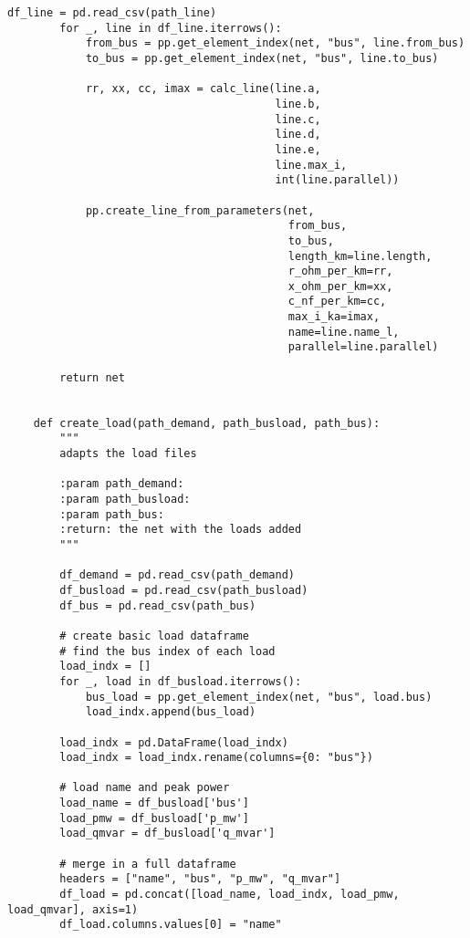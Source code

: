 \begin{lstlisting}[caption={Main code in Python with the Pandapower library}]
        df_line = pd.read_csv(path_line)
        for _, line in df_line.iterrows():
            from_bus = pp.get_element_index(net, "bus", line.from_bus)
            to_bus = pp.get_element_index(net, "bus", line.to_bus)

            rr, xx, cc, imax = calc_line(line.a,
                                         line.b,
                                         line.c,
                                         line.d,
                                         line.e,
                                         line.max_i,
                                         int(line.parallel))

            pp.create_line_from_parameters(net,
                                           from_bus,
                                           to_bus,
                                           length_km=line.length,
                                           r_ohm_per_km=rr,
                                           x_ohm_per_km=xx,
                                           c_nf_per_km=cc,
                                           max_i_ka=imax,
                                           name=line.name_l,
                                           parallel=line.parallel)

        return net


    def create_load(path_demand, path_busload, path_bus):
        """
        adapts the load files

        :param path_demand:
        :param path_busload:
        :param path_bus:
        :return: the net with the loads added
        """

        df_demand = pd.read_csv(path_demand)
        df_busload = pd.read_csv(path_busload)
        df_bus = pd.read_csv(path_bus)

        # create basic load dataframe
        # find the bus index of each load
        load_indx = []
        for _, load in df_busload.iterrows():
            bus_load = pp.get_element_index(net, "bus", load.bus)
            load_indx.append(bus_load)

        load_indx = pd.DataFrame(load_indx)
        load_indx = load_indx.rename(columns={0: "bus"})

        # load name and peak power
        load_name = df_busload['bus']
        load_pmw = df_busload['p_mw']
        load_qmvar = df_busload['q_mvar']

        # merge in a full dataframe
        headers = ["name", "bus", "p_mw", "q_mvar"]
        df_load = pd.concat([load_name, load_indx, load_pmw, load_qmvar], axis=1)
        df_load.columns.values[0] = "name"


\end{lstlisting}
